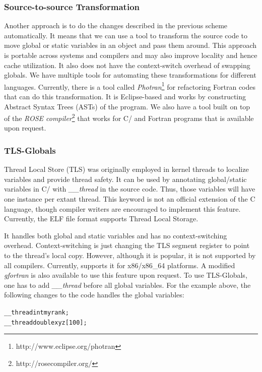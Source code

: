 \documentclass[10pt]{article}
\begin{document}
\subsubsection{Source-to-source Transformation}
Another approach is to do the changes described in the previous 
scheme automatically. It means that we can use a tool to transform 
the source code to move global or static variables in an object and pass them around.
This approach is portable across systems and compilers and may also 
improve locality and hence cache utilization. It also does not have the 
context-switch overhead of swapping globals. We have multiple tools for automating 
these transformations for different languages. Currently, there is a tool 
called \emph{Photran}\footnote{http://www.eclipse.org/photran}
for refactoring Fortran codes that can do this transformation. It is Eclipse-based
and works by constructing Abstract Syntax Trees (ASTs) of the program. We
also have a tool built on top of the \emph{ROSE compiler}\footnote{http://rosecompiler.org/}
that works for C/\CC{} and Fortran programs that is available upon request.

\subsubsection{TLS-Globals}
Thread Local Store (TLS) was originally employed in kernel threads to
localize variables and provide thread safety. It can be used by annotating
global/static variables in C/\CC{} with \emph{\_\_thread} in the source code.
Thus, those variables will have one instance per extant thread. This
keyword is not an official extension of the C language, though compiler
writers are encouraged to implement this feature. Currently, the ELF file
format supports Thread Local Storage.

It handles both global and static variables and has no context-switching
 overhead. Context-switching is just changing the TLS segment register
 to point to the thread's local copy. However, although it is popular, it  
is not supported by all compilers. Currently, \charmpp{} supports it for x86/x86\_64 platforms. 
A modified \emph{gfortran} is also available to use this feature upon request.
To use TLS-Globals, one has to add \emph{\_\_thread} before all global variables. For the example
above, the following changes to the code handles the global variables:
\begin{alltt}
__thread int myrank;
__thread double xyz[100];
\end{alltt}
\end{document}
